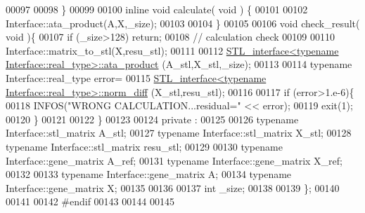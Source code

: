 \begin{DoxyCode}
00097 
00098   \}
00099 
00100   \textcolor{keyword}{inline} \textcolor{keywordtype}{void} calculate( \textcolor{keywordtype}{void} ) \{
00101 
00102       Interface::ata\_product(A,X,\_size);
00103 
00104   \}
00105 
00106   \textcolor{keywordtype}{void} check\_result( \textcolor{keywordtype}{void} )\{
00107     \textcolor{keywordflow}{if} (\_size>128) \textcolor{keywordflow}{return};
00108     \textcolor{comment}{// calculation check}
00109 
00110     Interface::matrix\_to\_stl(X,resu\_stl);
00111 
00112     \hyperlink{class_s_t_l__interface}{STL\_interface<typename Interface::real\_type>::ata\_product}
      (A\_stl,X\_stl,\_size);
00113 
00114     \textcolor{keyword}{typename} Interface::real\_type error=
00115       \hyperlink{class_s_t_l__interface}{STL\_interface<typename Interface::real\_type>::norm\_diff}
      (X\_stl,resu\_stl);
00116 
00117     \textcolor{keywordflow}{if} (error>1.e-6)\{
00118       INFOS(\textcolor{stringliteral}{"WRONG CALCULATION...residual="} << error);
00119       exit(1);
00120     \}
00121 
00122   \}
00123 
00124 private :
00125 
00126   \textcolor{keyword}{typename} Interface::stl\_matrix A\_stl;
00127   \textcolor{keyword}{typename} Interface::stl\_matrix X\_stl;
00128   \textcolor{keyword}{typename} Interface::stl\_matrix resu\_stl;
00129 
00130   \textcolor{keyword}{typename} Interface::gene\_matrix A\_ref;
00131   \textcolor{keyword}{typename} Interface::gene\_matrix X\_ref;
00132 
00133   \textcolor{keyword}{typename} Interface::gene\_matrix A;
00134   \textcolor{keyword}{typename} Interface::gene\_matrix X;
00135 
00136 
00137   \textcolor{keywordtype}{int} \_size;
00138 
00139 \};
00140 
00141 
00142 \textcolor{preprocessor}{#endif}
00143 
00144 
00145 
\end{DoxyCode}
